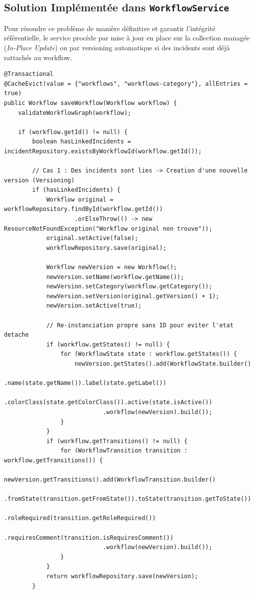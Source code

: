 \documentclass[11pt,a4paper]{article}
\begin{document}
\subsection{Solution Implémentée dans \texttt{WorkflowService}}

Pour résoudre ce problème de manière définitive et garantir l'intégrité référentielle, le service procède par mise à jour en place sur la collection managée (\textit{In-Place Update}) ou par versioning automatique si des incidents sont déjà rattachés au workflow.

\begin{lstlisting}[language=CustomJava, caption={Algorithme de sauvegarde securise dans WorkflowService.java}]
@Transactional
@CacheEvict(value = {"workflows", "workflows-category"}, allEntries = true)
public Workflow saveWorkflow(Workflow workflow) {
    validateWorkflowGraph(workflow);

    if (workflow.getId() != null) {
        boolean hasLinkedIncidents = incidentRepository.existsByWorkflowId(workflow.getId());
        
        // Cas 1 : Des incidents sont lies -> Creation d'une nouvelle version (Versioning)
        if (hasLinkedIncidents) {
            Workflow original = workflowRepository.findById(workflow.getId())
                    .orElseThrow(() -> new ResourceNotFoundException("Workflow original non trouve"));
            original.setActive(false);
            workflowRepository.save(original);

            Workflow newVersion = new Workflow();
            newVersion.setName(workflow.getName());
            newVersion.setCategory(workflow.getCategory());
            newVersion.setVersion(original.getVersion() + 1);
            newVersion.setActive(true);

            // Re-instanciation propre sans ID pour eviter l'etat detache
            if (workflow.getStates() != null) {
                for (WorkflowState state : workflow.getStates()) {
                    newVersion.getStates().add(WorkflowState.builder()
                            .name(state.getName()).label(state.getLabel())
                            .colorClass(state.getColorClass()).active(state.isActive())
                            .workflow(newVersion).build());
                }
            }
            if (workflow.getTransitions() != null) {
                for (WorkflowTransition transition : workflow.getTransitions()) {
                    newVersion.getTransitions().add(WorkflowTransition.builder()
                            .fromState(transition.getFromState()).toState(transition.getToState())
                            .roleRequired(transition.getRoleRequired())
                            .requiresComment(transition.isRequiresComment())
                            .workflow(newVersion).build());
                }
            }
            return workflowRepository.save(newVersion);
        }


\end{lstlisting}
\end{document}
